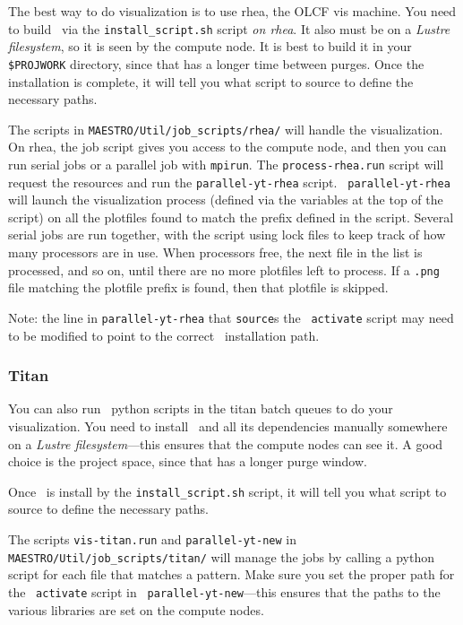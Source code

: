 The best way to do visualization is to use rhea, the OLCF vis machine.
You need to build \yt\ via the {\tt install\_script.sh} script {\em on
rhea}.  It also must be on a {\em Lustre filesystem}, so it is seen by
the compute node.  It is best to build it in your {\tt \$PROJWORK} directory,
since that has a longer time between purges.  Once the installation is
complete, it will tell you what script to source to define the
necessary paths.

The scripts in {\tt MAESTRO/Util/job\_scripts/rhea/} will handle the
visualization.  On rhea, the job script gives you access to the
compute node, and then you can run serial jobs or a parallel job with
{\tt mpirun}.  The {\tt process-rhea.run} script will request the
resources and run the {\tt parallel-yt-rhea} script.  {\tt
parallel-yt-rhea} will launch the visualization process (defined
via the variables at the top of the script) on all the plotfiles
found to match the prefix defined in the script.  Several serial
jobs are run together, with the script using lock files to keep track
of how many processors are in use.  When processors free, the next
file in the list is processed, and so on, until there are no more
plotfiles left to process.  If a {\tt .png} file matching the
plotfile prefix is found, then that plotfile is skipped.

Note: the line in {\tt parallel-yt-rhea} that {\tt source}s the \yt\
{\tt activate} script may need to be modified to point to the
correct \yt\ installation path.


\subsubsection{Titan}

You can also run \yt\ python scripts in the titan batch queues to do your
visualization.  You need to install \yt\ and all its dependencies
manually somewhere on a {\em Lustre filesystem}---this ensures that the
compute nodes can see it.  A good choice is the project space, since
that has a longer purge window.

Once \yt\ is install by the {\tt install\_script.sh} script, it will
tell you what script to source to define the necessary paths.

The scripts {\tt vis-titan.run} and {\tt parallel-yt-new} in {\tt
MAESTRO/Util/job\_scripts/titan/} will manage the \yt jobs by calling a
python script for each file that matches a pattern.  Make sure you set
the proper path for the \yt\ {\tt activate} script in {\tt
parallel-yt-new}---this ensures that the paths to the various libraries
are set on the compute nodes.

